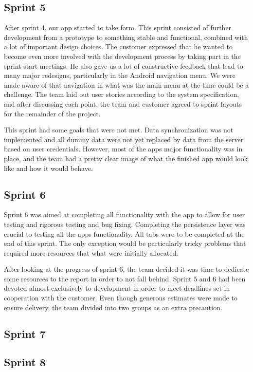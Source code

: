 \subsection{Sprint 5}
After sprint 4, our app started to take form. This sprint consisted of further development from a prototype to something stable and functional, combined with a lot of important design choices. The customer expressed that he wanted to become even more involved with the development process by taking part in the sprint start meetings.
He also gave us a lot of constructive feedback that lead to many major redesigns, particularly in the Android navigation menu. We were made aware of that navigation in what was the main menu at the time could be a challenge. The team laid out user stories according to the system specification, and after discussing each point, the team and customer agreed to sprint layouts for the remainder of the project.

This sprint had some goals that were not met. Data synchronization was not implemented and all dummy data were not yet replaced by data from the server based on user credentials. However, most of the apps major functionality was in place, and the team had a pretty clear image of what the finished app would look like and how it would behave.

\subsection{Sprint 6}
Sprint 6 was aimed at completing all functionality with the app to allow for user testing and rigorous testing and bug fixing. Completing the persistence layer was crucial to testing all the apps functionality. All tabs were to be completed at the end of this sprint. The only exception would be particularly tricky problems that required more resources that what were initially allocated.

After looking at the progress of sprint 6, the team decided it was time to dedicate some resources to the report in order to not fall behind. Sprint 5 and 6 had been devoted almost exclusively to development in order to meet deadlines set in cooperation with the customer. Even though generous estimates were made to ensure delivery, the team divided into two groups as an extra precaution. 

\subsection{Sprint 7}

\subsection{Sprint 8}
